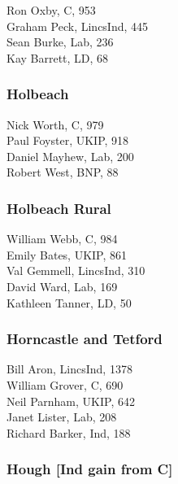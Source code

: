 \documentclass[a4paper,openany,10pt]{book}
\begin{document}
Ron Oxby, C, 953\\
Graham Peck, LincsInd, 445\\
Sean Burke, Lab, 236\\
Kay Barrett, LD, 68\\


\subsubsection*{Holbeach}



Nick Worth, C, 979\\
Paul Foyster, UKIP, 918\\
Daniel Mayhew, Lab, 200\\
Robert West, BNP, 88\\


\subsubsection*{Holbeach Rural}



William Webb, C, 984\\
Emily Bates, UKIP, 861\\
Val Gemmell, LincsInd, 310\\
David Ward, Lab, 169\\
Kathleen Tanner, LD, 50\\


\subsubsection*{Horncastle and Tetford}



Bill Aron, LincsInd, 1378\\
William Grover, C, 690\\
Neil Parnham, UKIP, 642\\
Janet Lister, Lab, 208\\
Richard Barker, Ind, 188\\


\subsubsection*{Hough \hspace*{\fill}\nolinebreak[1]%
\enspace\hspace*{\fill}
[Ind gain from C]}
\end{document}
